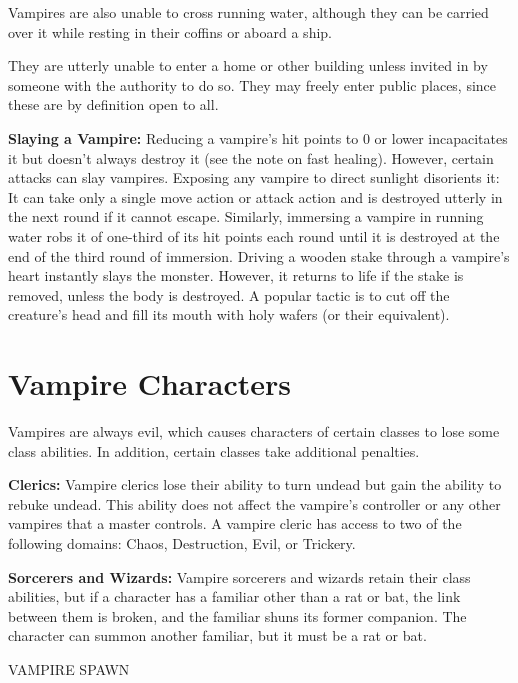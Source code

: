 \documentclass{article}
\begin{document}
Vampires are also unable to cross running water, although they can be carried over 
it while resting in their coffins or aboard a ship.

They are utterly unable to enter a home or other building unless invited in by 
someone with the authority to do so. They may freely enter public places, since 
these are by definition open to all. 

\textbf{Slaying a Vampire:} Reducing a vampire's hit points to 0 or lower incapacitates 
it but doesn't always destroy it (see the note on fast healing). However, certain 
attacks can slay vampires. Exposing any vampire to direct sunlight disorients it: 
It can take only a single move action or attack action and is destroyed utterly 
in the next round if it cannot escape. Similarly, immersing a vampire in running 
water robs it of one-third of its hit points each round until it is destroyed at 
the end of the third round of immersion. Driving a wooden stake through a vampire's 
heart instantly slays the monster. However, it returns to life if the stake is 
removed, unless the body is destroyed. A popular tactic is to cut off the creature's 
head and fill its mouth with holy wafers (or their equivalent).

\vspace{12pt}
\section*{Vampire Characters}

Vampires are always evil, which causes characters of certain classes to lose some 
class abilities. In addition,  certain classes take additional penalties.

\textbf{Clerics:} Vampire clerics lose their ability to turn undead but gain the 
ability to rebuke undead. This ability does not affect the vampire's controller 
or any other vampires that a master controls. A vampire cleric has access to two 
of the following domains: Chaos, Destruction, Evil, or Trickery.

\textbf{Sorcerers and Wizards:} Vampire sorcerers and wizards retain their class 
abilities, but if a character has a familiar other than a rat or bat, the link 
between them is broken, and the familiar shuns its former companion. The character 
can summon another familiar, but it must be a rat or bat.

\vspace{12pt}
{\LARGE{}VAMPIRE SPAWN}
\end{document}
